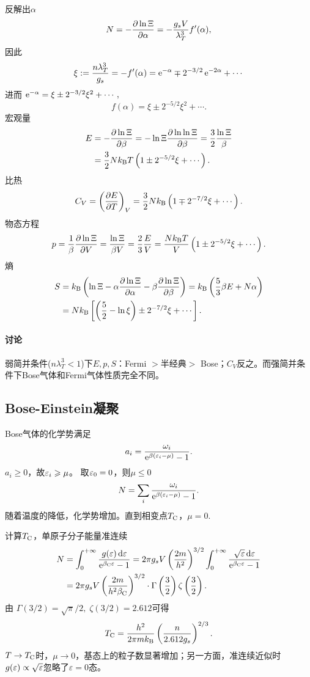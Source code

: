 反解出$\alpha$
\[
	N=-\frac{\partial^{\;\!\!}\ln\Xi}{\partial \alpha^{\;\!\!}}=-\frac{g_sV}{\lambda_T^3}f'(\alpha),
\]
因此
\[
	\xi:=\frac{n\lambda_T^3}{g_s}=-f'(\alpha)=\mathop{}\!\mathrm{e}^{-\alpha}\mp 2^{-3/2}\mathop{}\!\mathrm{e}^{-2\alpha}+\cdots
\]
进而
\(\mathop{}\!\mathrm{e}^{-\alpha}=\xi\pm{2^{-3/2}}\xi^2+\cdots,\)
\[
	f(\alpha)=\xi\pm 2^{-5/2}\xi^2+\cdots.
\]
宏观量
\begin{align}\notag
	E & =-\pv{\ln\Xi}\beta=-\ln\Xi\pv{\ln\ln\Xi}\beta=\frac32\frac{\ln\Xi}\beta \\
	  & =\frac32N\kB T\kh{1\pm 2^{-5/2}\xi+\cdots}.
\end{align}
比热
\begin{align}
	C_V=\left(\frac{\partial^{\;\!\!}E}{\partial T^{\;\!\!}}\right)_V=\frac32Nk_{\mathrm B}\left(1\mp 2^{-7/2}\xi+\cdots\right).
\end{align}
物态方程
\begin{align}
	p=\frac1\beta\frac{\partial^{\;\!\!}\ln\Xi}{\partial V^{\;\!\!}}=\frac{\ln\Xi}{\beta V}=\frac23\frac EV=\frac{Nk_{\mathrm B} T}V\left(1\pm 2^{-5/2}\xi+\cdots\right).
\end{align}
熵
\begin{align}\notag
	S&=\kB\kh{\ln\Xi-\alpha\pv{\ln\Xi}\alpha-\beta\pv{\ln\Xi}\beta}=\kB\kh{\frac53\beta E+N\alpha}\\
	&=N\kB\fkh{\kh{\frac52-\ln\xi}\pm 2^{-7/2}\xi+\cdots}.
\end{align}
\paragraph*{讨论}弱简并条件($n\lambda_T^3<1$)下$E,p,S$：Fermi $>$半经典$>$ Bose；$C_V$反之。而强简并条件下Bose气体和Fermi气体性质完全不同。
\subsection{Bose-Einstein凝聚}
Bose气体的化学势满足
\[
	a_i=\frac{\omega_i}{\mathop{}\!\mathrm{e}^{\beta(\varepsilon_i-\mu)}-1}.
\]
$a_i\geqslant 0$，故$\varepsilon_i\geqslant \mu$。
取$\varepsilon_0=0$，则$\mu\leqslant 0$
\[
	N=\sum_i\frac{\omega_i}{\mathop{}\!\mathrm{e}^{\beta(\varepsilon_i-\mu)}-1}.
\]
随着温度的降低，化学势增加。直到相变点$T_\mathrm C$，$\mu=0$.

计算$T_\mathrm C$，单原子分子能量准连续
\begin{align*}
	N&=\int_0^{+\infty}\frac{g(\varepsilon)\mathop{}\!\mathrm{d}\varepsilon}{\mathop{}\!\mathrm{e}^{\beta_\mathrm C\varepsilon}-1}=2\pi g_sV\left(\frac{2m}{h^2}\right)^{3/2}\int_0^{+\infty}\frac{\sqrt\varepsilon\mathop{}\!\mathrm{d}\varepsilon}{\mathop{}\!\mathrm{e}^{\beta_\mathrm C\varepsilon}-1}\\
	&=2\pi g_sV\left(\frac{2m}{h^2\beta_\mathrm C}\right)^{3/2}\cdot\Gamma\left(\frac32\right)\zeta\left(\frac32\right).
\end{align*}
由
$\Gamma(3/2)=\sqrt\pi/2,\;\zeta(3/2)=2.612$可得
\begin{align}\label{Bose-TC}
	T_\mathrm C=\frac{h^2}{2\pi mk_{\mathrm B}}\left(\frac n{2.612g_s}\right)^{2/3}.
\end{align}
$T\to T_\mathrm C$时，$\mu\to0$，基态上的粒子数显著增加；另一方面，准连续近似时$g(\varepsilon)\propto\sqrt\varepsilon$忽略了$\varepsilon=0$态。

